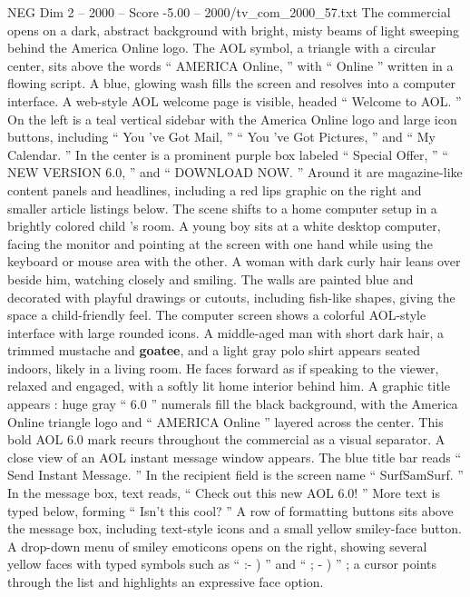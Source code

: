 \begin{textsample}{NEG Dim 2 – 2000 – Score -5.00 – 2000/tv\_com\_2000\_57.txt}  \label{ex:f2_neg_071}
The commercial opens on a dark, abstract background with bright, misty beams of light sweeping behind the America Online logo.
The AOL symbol, a triangle with a circular center, sits above the words “ AMERICA Online, ” with “ Online ” written in a flowing script.
A blue, glowing wash fills the screen and resolves into a computer interface.
A web-style AOL welcome page is visible, headed “ Welcome to AOL. ” On the left is a teal vertical sidebar with the America Online logo and large icon buttons, including “ You ’ve Got Mail, ” “ You ’ve Got Pictures, ” and “ My Calendar. ” In the center is a prominent purple box labeled “ Special Offer, ” “ NEW VERSION 6.0, ” and “ DOWNLOAD NOW. ” Around it are magazine-like content panels and headlines, including a red lips graphic on the right and smaller article listings below.
The scene shifts to a home computer setup in a brightly colored child ’s room.
A young boy sits at a white desktop computer, facing the monitor and pointing at the screen with one hand while using the keyboard or mouse area with the other.
A woman with dark curly hair leans over beside him, watching closely and smiling.
The walls are painted blue and decorated with playful drawings or cutouts, including fish-like shapes, giving the space a child-friendly feel.
The computer screen shows a colorful AOL-style interface with large rounded icons.
A middle-aged man with short dark hair, a trimmed mustache and \textbf{goatee}, and a light gray polo shirt appears seated indoors, likely in a living room.
He faces forward as if speaking to the viewer, relaxed and engaged, with a softly lit home interior behind him.
A graphic title appears : huge gray “ 6.0 ” numerals fill the black background, with the America Online triangle logo and “ AMERICA Online ” layered across the center.
This bold AOL 6.0 mark recurs throughout the commercial as a visual separator.
A close view of an AOL instant message window appears.
The blue title bar reads “ Send Instant Message. ” In the recipient field is the screen name “ SurfSamSurf. ” In the message box, text reads, “ Check out this new AOL 6.0! ” More text is typed below, forming “ Isn't this cool? ” A row of formatting buttons sits above the message box, including text-style icons and a small yellow smiley-face button.
A drop-down menu of smiley emoticons opens on the right, showing several yellow faces with typed symbols such as “ :- ) ” and “ ; - ) ” ; a cursor points through the list and highlights an expressive face option.

\end{textsample}
